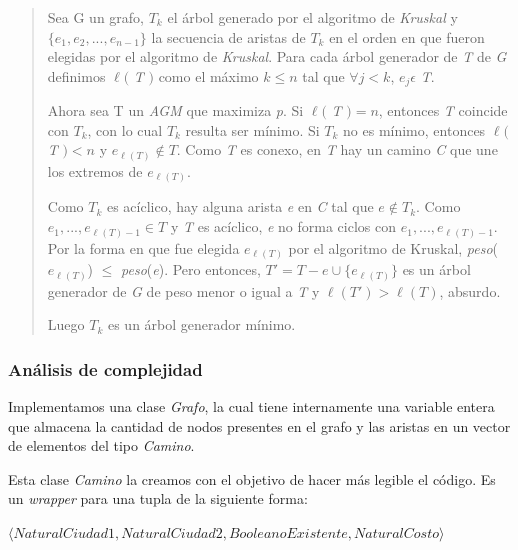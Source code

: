 \begin{itemize}
\begin{quotation}
\quad Sea G un grafo, $ T_k $ el \'arbol generado por el algoritmo de \textit{Kruskal} y $ \lbrace e_1, e_2, ..., e_{n-1} \rbrace $ la secuencia de aristas de $ T_k $ en el orden en que fueron elegidas por el algoritmo de \textit{Kruskal}. Para cada \'arbol generador de \textit{T} de \textit{G} definimos $\ell($ \textit{T} $)$ como el m\'aximo $ k \leq n $ tal que $ \forall j < k $, $ e_j \epsilon $ \textit{T}.

\quad Ahora sea T un \textit{AGM} que maximiza \textit{p}. Si $\ell($ \textit{T} $) = n $, entonces \textit{T} coincide con $ T_k $, con lo cual $ T_k $ resulta ser m\'inimo. Si $ T_k $ no es m\'inimo, entonces $\ell($ \textit{T} $) < n $ y $ e_{\ell(T)} \notin T $. Como \textit{T} es conexo, en \textit{T} hay un camino \textit{C} que une los extremos de $ e_{\ell(T)} $.

\quad Como $ T_k $ es ac\'iclico, hay alguna arista \textit{e} en \textit{C} tal que $ e\notin T_k $. Como $ e_1, ..., e_{\ell(T) - 1} \in T $ y \textit{T} es ac\'iclico, \textit{e} no forma ciclos con $ e_1, ..., e_{\ell(T) - 1} $.
Por la forma en que fue elegida $ e_{\ell(T)} $ por el algoritmo de Kruskal, \textit{peso}($e_{\ell(T)}$) $ \leq $ \textit{peso}(\textit{e}).
Pero entonces, $ T' = T - e \cup \lbrace e_{\ell(T)} \rbrace $ es un \'arbol generador de \textit{G} de peso menor o igual a \textit{T} y $ \ell(T') > \ell(T)$, absurdo.

\quad Luego $ T_k $ es un \'arbol generador m\'inimo.

\end{quotation} 

\end{itemize}

\subsubsection{An\'alisis de complejidad}

\quad Implementamos una clase \textit{Grafo}, la cual tiene internamente una variable entera que almacena la cantidad de nodos presentes en el grafo y las aristas en un vector de elementos del tipo \textit{Camino}. 

\quad

\quad Esta clase \textit{Camino} la creamos con el objetivo de hacer m\'as legible el c\'odigo. Es un \textit{wrapper} para una tupla de la siguiente forma: 

\quad

$ \langle Natural Ciudad1, Natural Ciudad2, Booleano Existente, Natural Costo \rangle$

